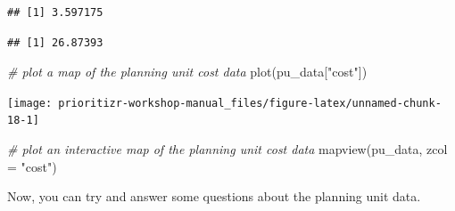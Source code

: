 \documentclass[
  12pt,
]{book}
\newenvironment{Shaded}{\begin{snugshade}}{\end{snugshade}}
\newcommand{\AttributeTok}[1]{\textcolor[rgb]{0.77,0.63,0.00}{#1}}
\newcommand{\CommentTok}[1]{\textcolor[rgb]{0.56,0.35,0.01}{\textit{#1}}}
\newcommand{\FunctionTok}[1]{\textcolor[rgb]{0.00,0.00,0.00}{#1}}
\newcommand{\NormalTok}[1]{#1}
\newcommand{\SpecialCharTok}[1]{\textcolor[rgb]{0.00,0.00,0.00}{#1}}
\newcommand{\StringTok}[1]{\textcolor[rgb]{0.31,0.60,0.02}{#1}}
\begin{document}
\begin{verbatim}
## [1] 3.597175
\end{verbatim}

\begin{Shaded}
\end{Shaded}

\begin{verbatim}
## [1] 26.87393
\end{verbatim}

\begin{Shaded}
\begin{Highlighting}[]
\CommentTok{\# plot a map of the planning unit cost data}
\FunctionTok{plot}\NormalTok{(pu\_data[}\StringTok{"cost"}\NormalTok{])}
\end{Highlighting}
\end{Shaded}

\begin{center}\texttt{[image: prioritizr-workshop-manual\_files/figure-latex/unnamed-chunk-18-1]} \end{center}

\begin{Shaded}
\begin{Highlighting}[]
\CommentTok{\# plot an interactive map of the planning unit cost data}
\FunctionTok{mapview}\NormalTok{(pu\_data, }\AttributeTok{zcol =} \StringTok{"cost"}\NormalTok{)}
\end{Highlighting}
\end{Shaded}

Now, you can try and answer some questions about the planning unit data.
\end{document}
